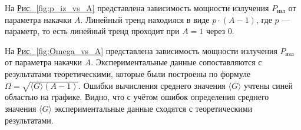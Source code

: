\documentclass[12pt]{article}
\newcommand*{\figref}[2][]{\hyperref[#2]{Рис.~\ref*{#2}#1}}
\begin{document}
	На \figref{fig:p_iz_vs_A} представлена зависимость мощности излучения $P_\text{изл}$ от параметра накачки $A$. Линейный тренд находился в виде $p\cdot(A - 1)$, где $p$ --- параметр, то есть линейный тренд проходит при $A=1$ через 0.

	

	На \figref{fig:Omega_vs_A} представлена зависимость мощности излучения $P_\text{изл}$ от параметра накачки $A$. Экспериментальные данные сопоставляются с результатами теоретическими, которые были построены по формуле $\Omega=\sqrt{\langle G \rangle (A-1)}$. Ошибки вычисления среднего значения $\langle G \rangle$ учтены синей областью на графике. Видно, что с учётом ошибок определения среднего значения $\langle G \rangle$ экспериментальные данные сходятся с теоретическими результатами.

\end{document}
